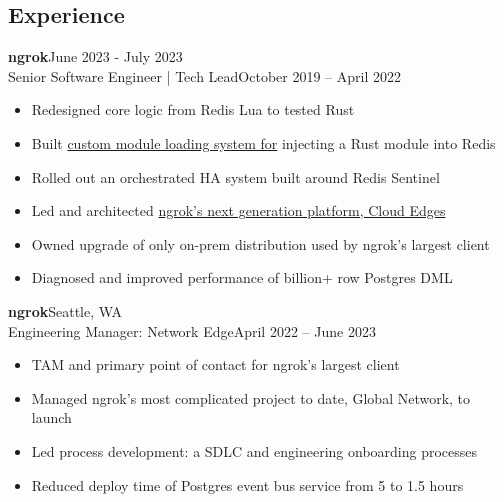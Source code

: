 \documentclass[margin]{res}
\begin{document}
  \begin{resume}
    \section{Experience}
       \textbf{ngrok}\hfill June 2023 - July 2023\\
         Senior Software Engineer | Tech Lead\hfill October 2019 -- April 2022\\
         \begin{itemize} \itemsep -1pt  %
            \item Redesigned core logic from Redis Lua to tested Rust
            \item Built \href{https://github.com/brhoades/redis-loadmodbytes}{custom module loading system for} injecting a Rust module into Redis
            \item Rolled out an orchestrated HA system built around Redis Sentinel
            \item Led and architected \href{https://ngrok.com/next-generation}{ngrok's next generation platform, Cloud Edges}
            \item Owned upgrade of only on-prem distribution used by ngrok's largest client
            \item Diagnosed and improved performance of billion+ row Postgres DML
         \end{itemize}

       \textbf{ngrok}\hfill Seattle, WA\\
         Engineering Manager: Network Edge\hfill April 2022 -- June 2023\\
         \begin{itemize} \itemsep -1pt  %
            \item TAM and primary point of contact for ngrok's largest client
            \item Managed ngrok's most complicated project to date, Global Network, to launch
            \item Led process development: a SDLC and engineering onboarding processes
            \item Reduced deploy time of Postgres event bus service from 5 to 1.5 hours
         \end{itemize}



\end{resume}
\end{document}
